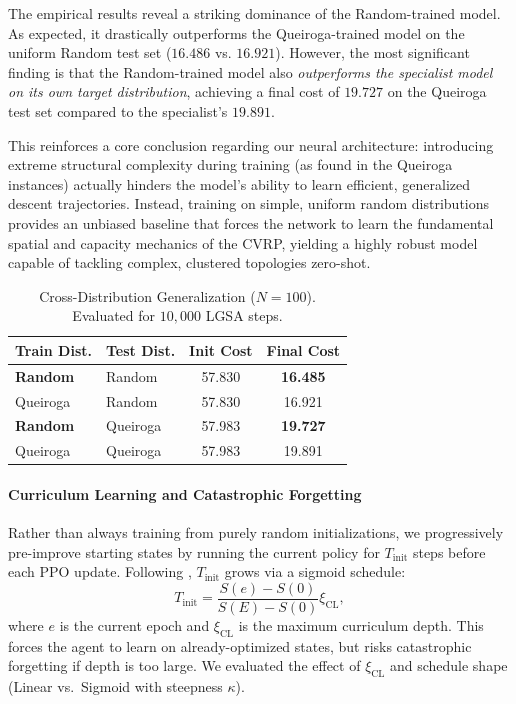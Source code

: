 \documentclass[letterpaper]{article} %
\begin{document}
The empirical results reveal a striking dominance of the Random-trained model. As expected, it drastically outperforms the Queiroga-trained model on the uniform Random test set ($16.486$ vs. $16.921$). However, the most significant finding is that the Random-trained model also \textit{outperforms the specialist model on its own target distribution}, achieving a final cost of $19.727$ on the Queiroga test set compared to the specialist's $19.891$. 

This reinforces a core conclusion regarding our neural architecture: introducing extreme structural complexity during training (as found in the Queiroga instances) actually hinders the model's ability to learn efficient, generalized descent trajectories. Instead, training on simple, uniform random distributions provides an unbiased baseline that forces the network to learn the fundamental spatial and capacity mechanics of the CVRP, yielding a highly robust model capable of tackling complex, clustered topologies zero-shot.

\begin{table}[h]
\centering
\small
\caption{Cross-Distribution Generalization ($N=100$). Evaluated for $10{,}000$ LGSA steps.}
\label{tab:data_generalization}
\begin{tabular}{l l c c}
\toprule
\textbf{Train Dist.} & \textbf{Test Dist.} & \textbf{Init Cost} & \textbf{Final Cost} \\
\midrule
\textbf{Random} & Random & 57.830 & \textbf{16.485} \\
Queiroga & Random & 57.830 & 16.921 \\
\midrule
\textbf{Random} & Queiroga & 57.983 & \textbf{19.727} \\
Queiroga & Queiroga & 57.983 & 19.891 \\
\bottomrule
\end{tabular}
\end{table}

\paragraph{Curriculum Learning and Catastrophic Forgetting}
Rather than always training from purely random initializations, we progressively pre-improve starting states by running the current policy for $T_{\text{init}}$ steps before each PPO update. Following \citet{ma_learning_2021}, $T_{\text{init}}$ grows via a sigmoid schedule:
\begin{equation}
    T_{\text{init}} = \frac{S(e) - S(0)}{S(E) - S(0)} \xi_{\text{CL}},
\end{equation}
where $e$ is the current epoch and $\xi_{\text{CL}}$ is the maximum curriculum depth. This forces the agent to learn on already-optimized states, but risks catastrophic forgetting if depth is too large. We evaluated the effect of $\xi_{\text{CL}}$ and schedule shape (Linear vs.\ Sigmoid with steepness $\kappa$).
\end{document}
